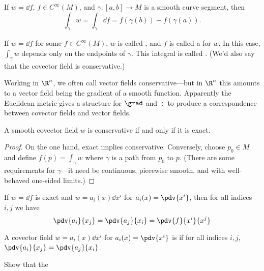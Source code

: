 \begin{thm}
    If $w = \dd{f}$, $f \in C^\infty(M)$, and $\gamma \colon [a,b]\to M$ is a smooth curve segment, then 
    \begin{equation*}
        \int_\gamma w = \int_\gamma \dd{f} = f(\gamma(b)) - f(\gamma(a)).
    \end{equation*}
\end{thm}

If $w = \dd{f}$ for some $f \in C^\infty(M)$, $w$ is called , and $f$ is called a  for $w$. In this case, $\int_\gamma w$ depends only on the endpoints of $\gamma$. This integral is called . (We'd also say that the covector field is conservative.)

\begin{note}[]
    Working in $\R^n$, we often call vector fields conservative---but in $\R^n$ this amounts to a vector field being the gradient of a smooth function. Apparently the Euclidean metric gives a structure for $\grad$ and $\div$ to produce a correspondence between covector fields and vector fields.
\end{note}

\begin{thm}[]
    A smooth covector field $w$ is conservative if and only if it is exact.
\end{thm}

\begin{proof}
On the one hand, exact implies conservative. Conversely, choose $p_0 \in M$ and define $f(p) = \int_\gamma w$ where $\gamma$ is a path from $p_0$ to $p$.
(There are some requirements for $\gamma$---it need be continuous, piecewise smooth, and with well-behaved one-sided limits.)
\end{proof}

\begin{prop}
   If $w = \dd{f}$ is exact and $w = a_i(x) \dd{x^i}$ for $a_i(x) = \pdv{x^i}$, then for all indices $i,j$ we have
   \begin{equation*}
       \pdv{a_i}{x_j} = 
       \pdv{a_j}{x_i} =
       \pdv{f}{x^i}{x^j}
   \end{equation*}
\end{prop}

\begin{defn}[]
    A covector field $w = a_i(x) \dd{x^i}$ for $a_i(x) = \pdv{x^i}$ is  if for all indices $i,j$, $\pdv{a_i}{x_j} = \pdv{a_j}{x_i}$.
\end{defn}

\begin{todo}[]
    Show that the 
\end{todo}
